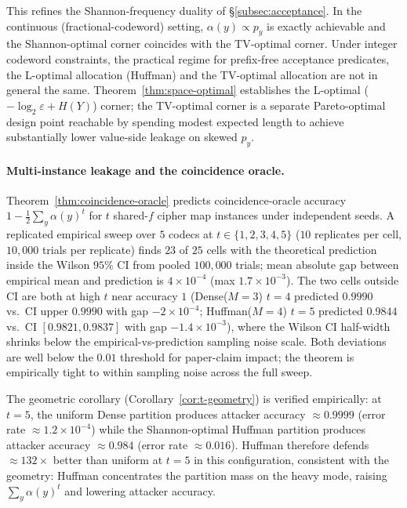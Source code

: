 \documentclass[11pt]{article}
\theoremstyle{definition}
\theoremstyle{plain}
\theoremstyle{remark}
\begin{document}
This refines the Shannon-frequency duality of
\S\ref{subsec:acceptance}.  In the continuous (fractional-codeword)
setting, $\alpha(y) \propto p_y$ is exactly achievable and the
Shannon-optimal corner coincides with the TV-optimal corner.  Under
integer codeword constraints, the practical regime for prefix-free
acceptance predicates, the L-optimal allocation (Huffman) and the
TV-optimal allocation are not in general the same.
Theorem~\ref{thm:space-optimal} establishes the L-optimal
($-\log_2 \varepsilon + H(Y)$) corner; the TV-optimal corner is a
separate Pareto-optimal design point reachable by spending modest
expected length to achieve substantially lower value-side leakage on
skewed $p_y$.

\paragraph{Multi-instance leakage and the coincidence oracle.}
Theorem~\ref{thm:coincidence-oracle} predicts coincidence-oracle
accuracy $1 - \tfrac{1}{2} \sum_y \alpha(y)^t$ for $t$ shared-$f$
cipher map instances under independent seeds.  A replicated
empirical sweep over $5$ codecs at $t \in \{1, 2, 3, 4, 5\}$
($10$ replicates per cell, $10{,}000$ trials per replicate)
finds $23$ of $25$ cells with the theoretical prediction inside
the Wilson $95\%$ CI from pooled $100{,}000$ trials; mean absolute
gap between empirical mean and prediction is
$4 \times 10^{-4}$ (max $1.7 \times 10^{-3}$).  The two cells
outside CI are both at high $t$ near accuracy $1$
(Dense($M{=}3$) $t{=}4$ predicted $0.9990$ vs.\ CI upper $0.9990$
with gap $-2 \times 10^{-4}$; Huffman($M{=}4$) $t{=}5$ predicted
$0.9844$ vs.\ CI $[0.9821, 0.9837]$ with gap $-1.4 \times 10^{-3}$),
where the Wilson CI half-width shrinks below the empirical-vs-prediction
sampling noise scale.  Both deviations are well below the
$0.01$ threshold for paper-claim impact; the theorem is empirically
tight to within sampling noise across the full sweep.

The geometric corollary (Corollary~\ref{cor:t-geometry}) is
verified empirically: at $t = 5$, the uniform Dense partition
produces attacker accuracy $\approx 0.9999$ (error rate
$\approx 1.2 \times 10^{-4}$) while the Shannon-optimal Huffman
partition produces attacker accuracy $\approx 0.984$ (error rate
$\approx 0.016$).  Huffman therefore defends $\approx 132\times$
better than uniform at $t = 5$ in this configuration, consistent
with the geometry: Huffman concentrates the partition mass on the
heavy mode, raising $\sum_y \alpha(y)^t$ and lowering attacker
accuracy.
\end{document}
